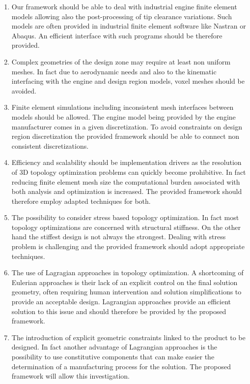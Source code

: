 \begin{enumerate}
\item Our framework should be able to deal with industrial engine finite element models allowing also the post-processing of tip clearance variations. Such models are often provided in industrial finite element software like Nastran or Abaqus. An efficient interface with such programs should be therefore provided.
\item Complex geometries of the design zone may require at least non uniform meshes. In fact due to aerodynamic needs and also to the kinematic interfacing with the engine and design region models, voxel meshes should be avoided.  
\item  Finite element simulations including inconsistent mesh interfaces between models should be allowed. The engine model being provided by the engine manufacturer comes in a given discretization. To avoid constraints on design region discretization the provided framework should be able to connect non consistent discretizations.
\item  Efficiency and scalability should be implementation drivers as the resolution of 3D topology optimization problems can quickly become prohibitive. In fact reducing finite element mesh size the computational burden associated with both analysis and optimization is increased. The provided framework should therefore employ adapted techniques for both.  
\item The possibility to consider stress based topology optimization. In fact most topology optimizations are concerned with  structural stiffness. On the other hand the stiffest design is not always the strongest. Dealing with stress problem is challenging and the provided framework should adopt appropriate techniques. 
\item The use of Lagragian approaches in topology optimization. A shortcoming of Eulerian approaches is their lack of an explicit control on the final solution geometry, often requiring human intervention and solution simplifications to provide an acceptable design. Lagrangian approaches provide an efficient solution to this issue and should therefore be provided by the proposed framework.
\item The introduction of explicit geometric constraints linked to the product to be designed. In fact another advantage of Lagrangian approaches is the possibility to use constitutive components that can make easier the determination of a manufacturing process for the solution. The proposed framework will allow this investigation.
\end{enumerate}

